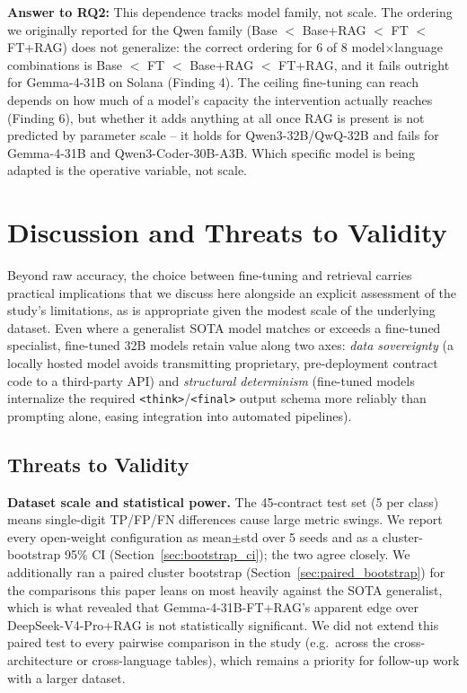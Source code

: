 \documentclass[lettersize,journal]{IEEEtran}
\newcommand{\rqanswer}[2]{\par\noindent\colorbox{gray!12}{\parbox{0.965\linewidth}{\vspace{0.15cm}\textbf{Answer
to #1:} #2\vspace{0.15cm}}}\par\vspace{0.25cm}}
\begin{document}
\rqanswer{RQ2}{This dependence tracks model family, not scale. The ordering we originally reported
for the Qwen family (Base $<$ Base+RAG $<$ FT $<$ FT+RAG) does not generalize: the correct ordering
for 6 of 8 model$\times$language combinations is Base $<$ FT $<$ Base+RAG $<$ FT+RAG, and it fails
outright for Gemma-4-31B on Solana (Finding 4). The ceiling fine-tuning can reach depends on how much
of a model's capacity the intervention actually reaches (Finding 6), but whether it adds anything at
all once RAG is present is not predicted by parameter scale -- it holds for Qwen3-32B/QwQ-32B and
fails for Gemma-4-31B and Qwen3-Coder-30B-A3B. Which specific model is being adapted is the operative
variable, not scale.}

\section{Discussion and Threats to Validity}
\label{sec:threats}

Beyond raw accuracy, the choice between fine-tuning and retrieval carries practical implications
that we discuss here alongside an explicit assessment of the study's limitations, as is appropriate
given the modest scale of the underlying dataset.
Even where a generalist SOTA model matches or exceeds a fine-tuned specialist, fine-tuned 32B models
retain value along two axes: \emph{data sovereignty} (a locally hosted model avoids transmitting
proprietary, pre-deployment contract code to a third-party API) and \emph{structural determinism}
(fine-tuned models internalize the required \texttt{<think>}/\texttt{<final>} output schema more
reliably than prompting alone, easing integration into automated pipelines).

\subsection{Threats to Validity}

\textbf{Dataset scale and statistical power.} The 45-contract test set (5 per class) means
single-digit TP/FP/FN differences cause large metric swings. We report every open-weight
configuration as mean$\pm$std over 5 seeds and as a cluster-bootstrap 95\% CI
(Section~\ref{sec:bootstrap_ci}); the two agree closely. We additionally ran a paired cluster
bootstrap (Section~\ref{sec:paired_bootstrap}) for the comparisons this paper leans on most
heavily against the SOTA generalist, which is what revealed that Gemma-4-31B-FT+RAG's apparent edge
over DeepSeek-V4-Pro+RAG is not statistically significant. We did not extend this paired test to
every pairwise comparison in the study (e.g.\ across the cross-architecture or cross-language
tables), which remains a priority for follow-up work with a larger dataset.
\end{document}
